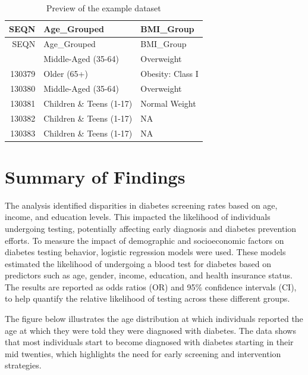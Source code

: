 \documentclass[
]{article}
\begin{document}
\begin{longtable}[]{@{}rll@{}}
\caption{Preview of the example dataset}\tabularnewline
\toprule\noalign{}
SEQN & Age\_Grouped & BMI\_Group \\
\midrule\noalign{}
\endfirsthead
\toprule\noalign{}
SEQN & Age\_Grouped & BMI\_Group \\
\midrule\noalign{}
\endhead
\bottomrule\noalign{}
\endlastfoot
130378 & Middle-Aged (35-64) & Overweight \\
130379 & Older (65+) & Obesity: Class I \\
130380 & Middle-Aged (35-64) & Overweight \\
130381 & Children \& Teens (1-17) & Normal Weight \\
130382 & Children \& Teens (1-17) & NA \\
130383 & Children \& Teens (1-17) & NA \\
\end{longtable}

\section{Summary of Findings}\label{summary-of-findings}

The analysis identified disparities in diabetes screening rates based on
age, income, and education levels. This impacted the likelihood of
individuals undergoing testing, potentially affecting early diagnosis
and diabetes prevention efforts. To measure the impact of demographic
and socioeconomic factors on diabetes testing behavior, logistic
regression models were used. These models estimated the likelihood of
undergoing a blood test for diabetes based on predictors such as age,
gender, income, education, and health insurance status. The results are
reported as odds ratios (OR) and 95\% confidence intervals (CI), to help
quantify the relative likelihood of testing across these different
groups.

The figure below illustrates the age distribution at which individuals
reported the age at which they were told they were diagnosed with
diabetes. The data shows that most individuals start to become diagnosed
with diabetes starting in their mid twenties, which highlights the need
for early screening and intervention strategies.
\end{document}
